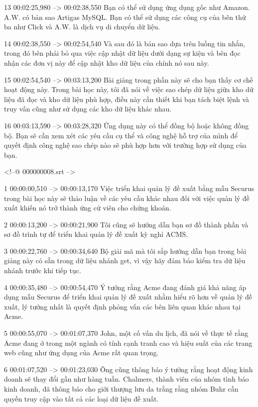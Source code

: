 13
00:02:25,980 --> 00:02:38,550
Bạn có thể sử dụng ứng dụng gốc như Amazon.  A.W.  có bản sao Artigas MySQL.  Bạn có thể sử dụng các công cụ của bên thứ ba như Click và A.W.  là dịch vụ di chuyển dữ liệu.

14
00:02:38,550 --> 00:02:54,540
Và sau đó là bản sao dựa trên luồng tin nhắn, trong đó bên phải bỏ qua việc cập nhật dữ liệu dưới dạng sự kiện và bên đọc nhận các đơn vị này để cập nhật kho dữ liệu của chính nó sau này.

15
00:02:54,540 --> 00:03:13,200
Bài giảng trong phần này sẽ cho bạn thấy cơ chế hoạt động này.  Trong bài học này, tôi đã nói về việc sao chép dữ liệu giữa kho dữ liệu đã đọc và kho dữ liệu phù hợp, điều này cần thiết khi bạn tách biệt lệnh và truy vấn cũng như sử dụng các kho dữ liệu khác nhau.

16
00:03:13,590 --> 00:03:28,320
Ứng dụng này có thể đồng bộ hoặc không đồng bộ.  Bạn sẽ cần xem xét các yêu cầu cụ thể và công nghệ hỗ trợ của mình để quyết định công nghệ sao chép nào sẽ phù hợp hơn với trường hợp sử dụng của bạn.

<!--@ 000000008.srt -->

1
00:00:00,510 --> 00:00:13,170
Việc triển khai quản lý đề xuất bằng mẫu Securus trong bài học này sẽ thảo luận về các yêu cầu khác nhau đối với việc quản lý đề xuất khiến nó trở thành ứng cử viên cho chứng khoán.

2
00:00:13,200 --> 00:00:21,900
Tôi cũng sẽ hướng dẫn bạn sơ đồ thành phần và sơ đồ trình tự để triển khai quản lý đề xuất kỳ nghỉ ACMS.

3
00:00:22,760 --> 00:00:34,640
Bộ giải mã mà tôi sắp hướng dẫn bạn trong bài giảng này có sẵn trong dữ liệu nhánh get, vì vậy hãy đảm bảo kiểm tra dữ liệu nhánh trước khi tiếp tục.

4
00:00:35,480 --> 00:00:54,470
Ý tưởng rằng Acme đang đánh giá khả năng áp dụng mẫu Securus để triển khai quản lý đề xuất nhằm hiểu rõ hơn về quản lý đề xuất, lý tưởng nhất là quyết định phỏng vấn các bên liên quan khác nhau tại Acme.

5
00:00:55,070 --> 00:01:07,370
John, một cố vấn du lịch, đã nói về thực tế rằng Acme đang ở trong một ngành có tính cạnh tranh cao và hiệu suất của các trang web cũng như ứng dụng của Acme rất quan trọng.

6
00:01:07,520 --> 00:01:23,030
Ông cũng thông báo ý tưởng rằng hoạt động kinh doanh sẽ thay đổi gần như hàng tuần.  Chalmers, thành viên của nhóm tình báo kinh doanh, đã thông báo cho giới thượng lưu da trắng rằng nhóm Buhr cần quyền truy cập vào tất cả các loại dữ liệu đề xuất.

